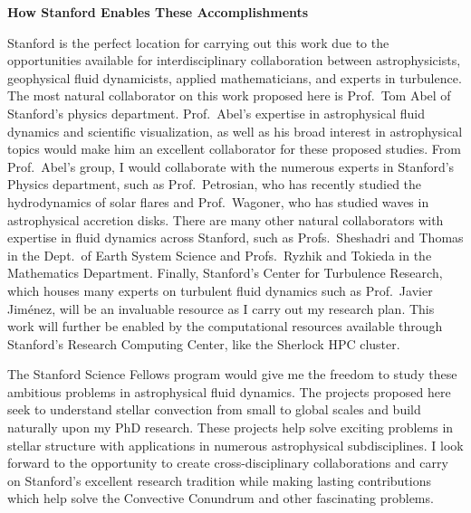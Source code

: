 \documentclass[onecolumn, 11pt, hmargin=1in, vmargin=1in]{aastex62}
\begin{document}
\begin{center}
\vspace{-5pt}
\textbf{How Stanford Enables These Accomplishments}
\vspace{-11pt}
\end{center}
Stanford is the perfect location for carrying out this work due to the opportunities available for interdisciplinary collaboration between astrophysicists, geophysical fluid dynamicists, applied mathematicians, and experts in turbulence.
The most natural collaborator on this work proposed here is Prof.~Tom Abel of Stanford's physics department.
Prof.~Abel's expertise in astrophysical fluid dynamics and scientific visualization, as well as his broad interest in astrophysical topics would make him an excellent collaborator for these proposed studies.
From Prof.~Abel's group, I would collaborate with the numerous experts in Stanford's Physics department, such as Prof.~Petrosian, who has recently studied the hydrodynamics of solar flares and Prof.~Wagoner, who has studied waves in astrophysical accretion disks.
There are many other natural collaborators with expertise in fluid dynamics across Stanford, such as Profs.~Sheshadri and Thomas in the Dept.~of Earth System Science and Profs.~Ryzhik and Tokieda in the Mathematics Department.
Finally, Stanford's Center for Turbulence Research, which houses many experts on turbulent fluid dynamics such as Prof.~Javier Jim\'{e}nez, will be an invaluable resource as I carry out my research plan.
This work will further be enabled by the computational resources available through Stanford's Research Computing Center, like the Sherlock HPC cluster.

The Stanford Science Fellows program would give me the freedom to study these ambitious problems in astrophysical fluid dynamics.
The projects proposed here seek to understand stellar convection from small to global scales and build naturally upon my PhD research.
These projects help solve exciting problems in stellar structure with applications in numerous astrophysical subdisciplines.
I look forward to the opportunity to create cross-disciplinary collaborations and carry on Stanford's excellent research tradition while making lasting contributions which help solve the Convective Conundrum and other fascinating problems. 

\vspace{-22pt}


\end{document}
